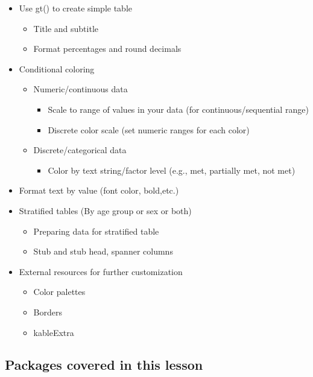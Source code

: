 \documentclass[
]{article}
\providecommand{\tightlist}{%
  \setlength{\itemsep}{0pt}\setlength{\parskip}{0pt}}
\begin{document}
\begin{itemize}
\item
  Use gt() to create simple table

  \begin{itemize}
  \item
    Title and subtitle
  \item
    Format percentages and round decimals
  \end{itemize}
\item
  Conditional coloring

  \begin{itemize}
  \item
    Numeric/continuous data

    \begin{itemize}
    \item
      Scale to range of values in your data (for continuous/sequential
      range)
    \item
      Discrete color scale (set numeric ranges for each color)
    \end{itemize}
  \item
    Discrete/categorical data

    \begin{itemize}
    \tightlist
    \item
      Color by text string/factor level (e.g., met, partially met, not
      met)
    \end{itemize}
  \end{itemize}
\item
  Format text by value (font color, bold,etc.)
\item
  Stratified tables (By age group or sex or both)

  \begin{itemize}
  \item
    Preparing data for stratified table
  \item
    Stub and stub head, spanner columns
  \end{itemize}
\item
  External resources for further customization

  \begin{itemize}
  \item
    Color palettes
  \item
    Borders
  \item
    kableExtra
  \end{itemize}
\end{itemize}

\hypertarget{packages-covered-in-this-lesson}{%
\subsection{Packages covered in this
lesson}\label{packages-covered-in-this-lesson}}
\end{document}

